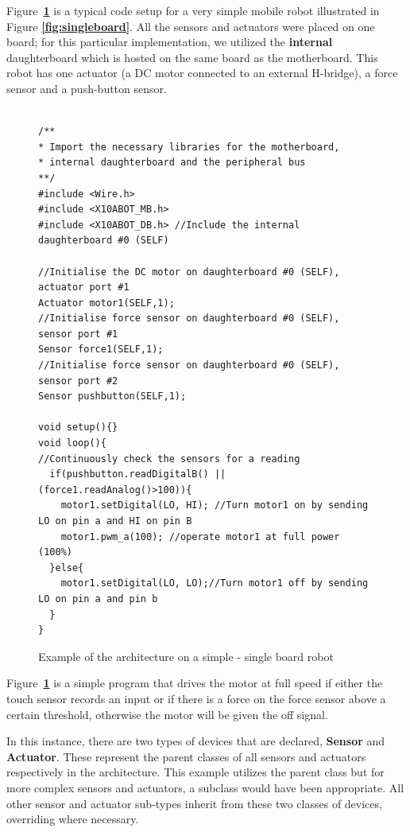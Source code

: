 Figure~\textbf{\ref{code:example}} is a typical code setup for a very simple mobile robot illustrated in Figure \textbf{\ref{fig:singleboard}}. All the sensors and actuators were placed on one board; for this particular implementation, we utilized the \textbf{internal} daughterboard which is hosted on the same board as the motherboard. This robot has one actuator (a DC motor connected to an external H-bridge), a force sensor and a push-button sensor.


	\begin{figure}
		\footnotesize
		\begin{verbatim}

/**
* Import the necessary libraries for the motherboard, 
* internal daughterboard and the peripheral bus
**/
#include <Wire.h>  
#include <X10ABOT_MB.h>
#include <X10ABOT_DB.h> //Include the internal daughterboard #0 (SELF)

//Initialise the DC motor on daughterboard #0 (SELF), actuator port #1
Actuator motor1(SELF,1);
//Initialise force sensor on daughterboard #0 (SELF), sensor port #1
Sensor force1(SELF,1);
//Initialise force sensor on daughterboard #0 (SELF), sensor port #2
Sensor pushbutton(SELF,1);

void setup(){}
void loop(){
//Continuously check the sensors for a reading
  if(pushbutton.readDigitalB() || (force1.readAnalog()>100)){
    motor1.setDigital(LO, HI); //Turn motor1 on by sending LO on pin a and HI on pin B
    motor1.pwm_a(100); //operate motor1 at full power (100%) 
  }else{
    motor1.setDigital(LO, LO);//Turn motor1 off by sending LO on pin a and pin b
  }
}	 
	\end{verbatim}
		\caption{Example of the \xten architecture on a simple - single board robot} \label{code:example}
	\end{figure}



Figure~\textbf{\ref{code:example}} is a simple program that drives the motor at full speed if either the touch sensor records an input or if there is a force on the force sensor above a certain threshold, otherwise the motor will be given the off signal.

In this instance, there are two types of devices that are declared, \textbf{Sensor} and \textbf{Actuator}. These represent the parent classes of all sensors and actuators respectively in the \xten architecture. This example utilizes the parent class but for more complex sensors and actuators, a subclass would have been appropriate. All other sensor and actuator sub-types inherit from these two classes of devices, overriding where necessary.

